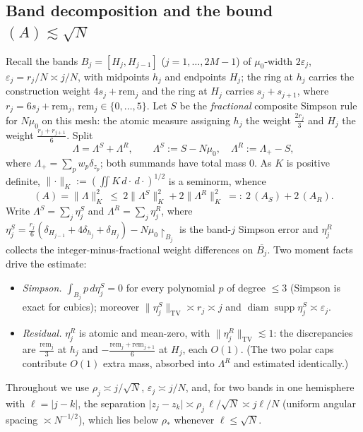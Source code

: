 \documentclass[11pt,reqno]{amsart}
\theoremstyle{definition}
\newcommand{\eps}{\varepsilon}
\newcommand{\ol}{\overline}
\newcommand{\abs}[1]{\lvert #1\rvert}
\newcommand{\rp}{\rho}
\newcommand{\lesss}{\lesssim}
\begin{document}
\subsection{Band decomposition and the bound \texorpdfstring{$(A)\lesss\sqrt N$}{(A) < sqrt N}}
Recall the bands $B_j=[H_j,H_{j-1}]$ ($j=1,\dots,2M-1$) of $\mu_0$-width $2\eps_j$, $\eps_j=r_j/N\asymp
j/N$, with midpoints $h_j$ and endpoints $H_j$; the ring at $h_j$ carries the construction weight
$4s_j+\mathrm{rem}_j$ and the ring at $H_j$ carries $s_j+s_{j+1}$, where $r_j=6s_j+\mathrm{rem}_j$,
$\mathrm{rem}_j\in\{0,\dots,5\}$. Let $S$ be the \emph{fractional} composite Simpson rule for $N\mu_0$ on
this mesh: the atomic measure assigning $h_j$ the weight $\tfrac{2r_j}{3}$ and $H_j$ the weight
$\tfrac{r_j+r_{j+1}}{6}$. Split
\begin{equation}\label{eq:SRsplit}
   \Lambda=\Lambda^{S}+\Lambda^{R},\qquad \Lambda^{S}:=S-N\mu_0,\quad \Lambda^{R}:=\Lambda_+-S,
\end{equation}
where $\Lambda_+=\sum_p w_p\delta_{z_p}$; both summands have total mass $0$. As $K$ is positive definite,
$\lVert\cdot\rVert_K:=(\iint K\,d\cdot\,d\cdot)^{1/2}$ is a seminorm, whence
\begin{equation}\label{eq:SRtriangle}
   (A)=\lVert\Lambda\rVert_K^2\ \le\ 2\lVert\Lambda^{S}\rVert_K^2+2\lVert\Lambda^{R}\rVert_K^2
   \ =:\ 2\,(A_S)+2\,(A_R).
\end{equation}
Write $\Lambda^{S}=\sum_j\eta_j^{S}$ and $\Lambda^{R}=\sum_j\eta_j^{R}$, where
$\eta_j^{S}=\tfrac{r_j}{6}(\delta_{H_{j-1}}+4\delta_{h_j}+\delta_{H_j})-N\mu_0\!\restriction_{B_j}$ is the
band-$j$ Simpson error and $\eta_j^{R}$ collects the integer-minus-fractional weight differences on
$\ol{B_j}$. Two moment facts drive the estimate:
\begin{itemize}[leftmargin=1.6em]
\item[\textup{(M1)}] \emph{Simpson.} $\int_{B_j} p\,d\eta_j^{S}=0$ for every polynomial $p$ of degree
$\le3$ (Simpson is exact for cubics); moreover $\lVert\eta_j^{S}\rVert_{\mathrm{TV}}\asymp r_j\asymp j$ and
$\operatorname{diam}\operatorname{supp}\eta_j^{S}\asymp\eps_j$.
\item[\textup{(M2)}] \emph{Residual.} $\eta_j^{R}$ is atomic and mean-zero, with
$\lVert\eta_j^{R}\rVert_{\mathrm{TV}}\lesss1$: the discrepancies are $\tfrac{\mathrm{rem}_j}{3}$ at $h_j$
and $-\tfrac{\mathrm{rem}_j+\mathrm{rem}_{j+1}}{6}$ at $H_j$, each $O(1)$. (The two polar caps contribute
$O(1)$ extra mass, absorbed into $\Lambda^R$ and estimated identically.)
\end{itemize}
Throughout we use $\rp_j\asymp j/\sqrt N$, $\eps_j\asymp j/N$, and, for two bands in one hemisphere with
$\ell=\abs{j-k}$, the separation $\abs{z_j-z_k}\asymp\rp_j\,\ell/\sqrt N\asymp j\ell/N$ (uniform angular
spacing $\asymp N^{-1/2}$), which lies below $\rp_\ast$ whenever $\ell\le\sqrt N$.
\end{document}
